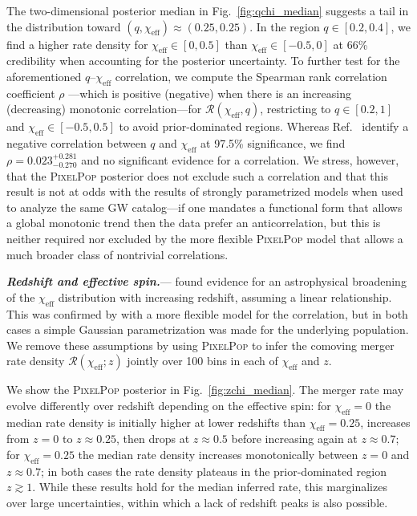 \documentclass[%
 reprint,
 amsmath,amssymb,
 aps,
 prl,
 nofootinbib,nobibnotes,
]{revtex4-2}
\newcommand{\heading}[1]{\textbf{\textit{#1.}}}
\begin{document}
The two-dimensional posterior median in Fig.~\ref{fig:qchi_median} suggests a tail in the distribution toward $(q, \chi_\mathrm{eff}) \approx (0.25, 0.25)$. In the region $q \in [0.2, 0.4]$, we find a higher rate density for $\chi_\mathrm{eff} \in [0, 0.5]$ than $\chi_\mathrm{eff} \in [-0.5,0]$ at 66\% credibility when accounting for the posterior uncertainty. To further test for the aforementioned $q$--$\chi_\mathrm{eff}$ correlation, we compute the Spearman rank correlation coefficient $\rho$ \cite{Spearman:1904abc,kendall1979advanced}---which is positive (negative) when there is an increasing (decreasing) monotonic correlation---for $\mathcal{R}(\chi_\mathrm{eff},q)$, restricting to $q \in [0.2, 1]$ and $\chi_\mathrm{eff} \in [-0.5,0.5]$ to avoid prior-dominated regions. Whereas Ref.~\cite{KAGRA:2021duu} identify a negative correlation between $q$ and $\chi_\mathrm{eff}$ at 97.5\% significance, we find $\rho = 0.023_{-0.270}^{+0.281}$ and no significant evidence for a correlation. We stress, however, that the \textsc{PixelPop} posterior does not exclude such a correlation and that this result is not at odds with the results of strongly parametrized models \cite{Callister:2021fpo, KAGRA:2021duu, Adamcewicz:2022hce, Heinzel:2023hlb} when used to analyze the same GW catalog---if one mandates a functional form that allows a global monotonic trend then the data prefer an anticorrelation, but this is neither required nor excluded by the more flexible \textsc{PixelPop} model that allows a much broader class of nontrivial correlations.

\heading{Redshift and effective spin}---\citeauthor{Biscoveanu:2022qac} \cite{Biscoveanu:2022qac} found evidence for an astrophysical broadening of the $\chi_\mathrm{eff}$ distribution with increasing redshift, assuming a linear relationship. This was confirmed by \citeauthor{Heinzel:2023hlb} \cite{Heinzel:2023hlb} with a more flexible model for the correlation, but in both cases a simple Gaussian parametrization was made for the underlying population. We remove these assumptions by using \textsc{PixelPop} to infer the comoving merger rate density $\mathcal{R}(\chi_\mathrm{eff};z)$ jointly over 100 bins in each of $\chi_\mathrm{eff}$ and $z$.

We show the \textsc{PixelPop} posterior in Fig.~\ref{fig:zchi_median}. The merger rate may evolve differently over redshift depending on the effective spin: for $\chi_\mathrm{eff}=0$ the median rate density is initially higher at lower redshifts than $\chi_\mathrm{eff}=0.25$, increases from $z=0$ to $z\approx0.25$, then drops at $z\approx0.5$ before increasing again at $z\approx0.7$; for $\chi_\mathrm{eff}=0.25$ the median rate density increases monotonically between $z=0$ and $z\approx0.7$; in both cases the rate density plateaus in the prior-dominated region $z\gtrsim1$. While these results hold for the median inferred rate, this marginalizes over large uncertainties, within which a lack of redshift peaks is also possible.
\end{document}
